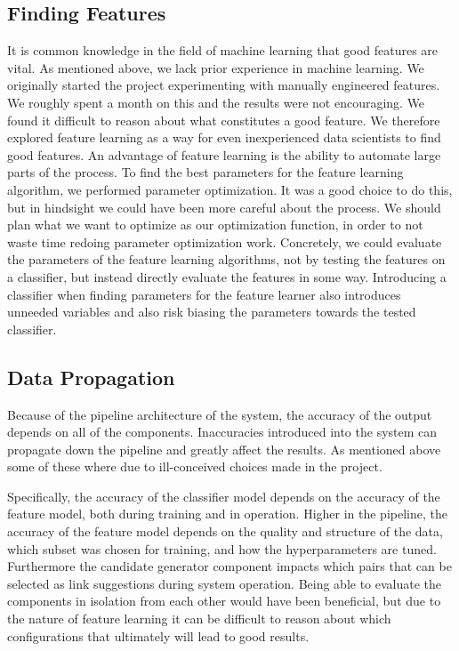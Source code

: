 \subsection{Finding Features}
It is common knowledge in the field of machine learning that good features are vital. As mentioned above, we lack prior experience in machine learning. We originally started the project experimenting with manually engineered features. We roughly spent a month on this and the results were not encouraging. We found it difficult to reason about what constitutes a good feature. We therefore explored feature learning as a way for even inexperienced data scientists to find good features. An advantage of feature learning is the ability to automate large parts of the process. To find the best parameters for the feature learning algorithm, we performed parameter optimization. It was a good choice to do this, but in hindsight we could have been more careful about the process. We should plan what we want to optimize as our optimization function, in order to not waste time redoing parameter optimization work. Concretely, we could evaluate the parameters of the feature learning algorithms, not by testing the features on a classifier, but instead directly evaluate the features in some way. Introducing a classifier when finding parameters for the feature learner also introduces unneeded variables and also risk biasing the parameters towards the tested classifier.

\subsection{Data Propagation}
Because of the pipeline architecture of the system, the accuracy of the output depends on all of the components.
Inaccuracies introduced into the system can propagate down the pipeline and greatly affect the results. As mentioned above some of these where due to ill-conceived choices made in the project. 

Specifically, the accuracy of the classifier model depends on the accuracy of the feature model, both during training and in operation. Higher in the pipeline, the accuracy of the feature model depends on the quality and structure of the data, which subset was chosen for training, and how the hyperparameters are tuned. Furthermore the candidate generator component impacts which pairs that can be selected as link suggestions during system operation.
Being able to evaluate the components in isolation from each other would have been beneficial, but due to the nature of feature learning it can be difficult to reason about which configurations that ultimately will lead to good results.


